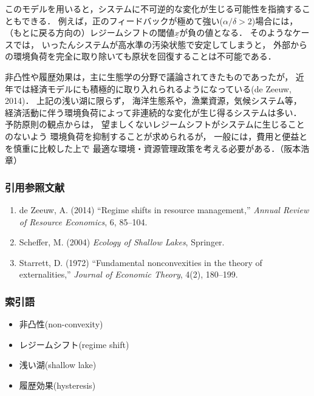 \documentclass[11pt,a4paper]{article}
\begin{document}
このモデルを用いると，システムに不可逆的な変化が生じる可能性を指摘することもできる．
例えば，正のフィードバックが極めて強い($\alpha/\delta > 2$)場合には，
（もとに戻る方向の）レジームシフトの閾値$\underline{x}$が負の値となる．
そのようなケースでは，
いったんシステムが高水準の汚染状態で安定してしまうと，
外部からの環境負荷を完全に取り除いても原状を回復することは不可能である．

非凸性や履歴効果は，主に生態学の分野で議論されてきたものであったが，
近年では経済モデルにも積極的に取り入れられるようになっている(de Zeeuw, 2014)．
上記の浅い湖に限らず，
海洋生態系や，漁業資源，気候システム等，
経済活動に伴う環境負荷によって非連続的な変化が生じ得るシステムは多い．
予防原則の観点からは，
望ましくないレジームシフトがシステムに生じることのないよう
環境負荷を抑制することが求められるが，
一般には，費用と便益とを慎重に比較した上で
最適な環境・資源管理政策を考える必要がある．（阪本浩章）

\clearpage

\subsubsection*{引用参照文献}

\begin{enumerate}
  \item de Zeeuw, A. (2014) ``Regime shifts in resource management,''
    \textit{Annual Review of Resource Economics}, 6, 85--104.
  \item Scheffer, M. (2004) \emph{Ecology of Shallow Lakes}, Springer.
  \item Starrett, D. (1972) ``Fundamental nonconvexities in the theory of externalities,''
    \textit{Journal of Economic Theory}, 4(2), 180--199.
\end{enumerate}

\subsubsection*{索引語}

\begin{itemize}
  \item 非凸性(non-convexity)
  \item レジームシフト(regime shift)
  \item 浅い湖(shallow lake)
  \item 履歴効果(hysteresis)
\end{itemize}
\end{document}
